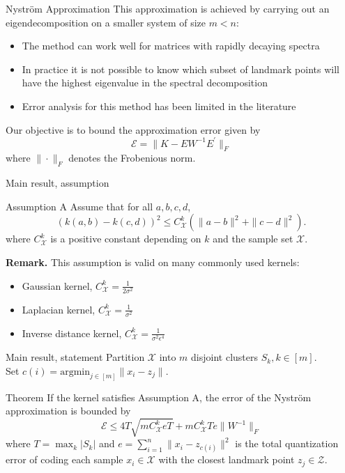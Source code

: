 \documentclass{beamer}
\renewcommand{\v}{\vspace{0.5em}}
\begin{document}
\begin{frame}{Nyström Approximation}
    This approximation is achieved by carrying out an eigendecomposition on a smaller system of size $m<n$:
    
    \begin{itemize}
        \item The method can work well for matrices with rapidly decaying spectra
        \item In practice it is not possible to know which subset of landmark points will have the highest eigenvalue in the spectral decomposition
        \item Error analysis for this method has been limited in the literature
    \end{itemize}
Our objective is to bound the approximation error given by
\begin{equation*}
    \mathcal{E}=\|K-EW^{-1}E^{\prime}\|_F
\end{equation*}
where $\|\cdot\|_F$ denotes the Frobenious norm.



\end{frame}


\begin{frame}{Main result, assumption}
\begin{block}{Assumption A}
Assume that for all $a,b,c,d$,
\begin{equation*}
    (k(a,b)-k(c,d))^2\leq C_{\mathcal{X}}^k (\|a-b\|^2+\|c-d\|^2).
\end{equation*}
where $C_{\mathcal{X}}^k$ is a positive constant depending on $k$ and the sample set $\mathcal{X}$.
\end{block}

\textbf{Remark.} This assumption is valid on many commonly used kernels:
\begin{itemize}
    \item Gaussian kernel, $C_{\mathcal{X}}^k=\frac{1}{2\sigma^2} $
    \item Laplacian kernel, $C_{\mathcal{X}}^k=\frac{1}{\sigma^2} $
    \item Inverse distance kernel, $C_{\mathcal{X}}^k=\frac{1}{\sigma^2 \epsilon^4} $
\end{itemize}
\end{frame}

\begin{frame}{Main result, statement}
Partition $\mathcal{X}$ into $m$ disjoint clusters $S_k, k\in [m]$. \\
\v
Set $c(i) = \textrm{argmin}_{j\in [m]} \|x_i-z_j\| $.
\begin{block}{Theorem}
If the kernel satisfies Assumption A, the error of the Nyström approximation is bounded by
\begin{equation*}
    \mathcal{E} \leq 4T\sqrt{mC_{\mathcal{X}}^k eT}+mC_{\mathcal{X}}^k Te \|W^{-1}\|_F
\end{equation*}
where $T=\max_k|S_k| $ and $e=\sum_{i=1 }^n \|x_i-z_{c(i)}\|^2$ is the total quantization error of coding each sample $x_i \in \mathcal{X}$ with the closest landmark point $z_j \in \mathcal{Z}$.
\end{block}


\end{frame}
\end{document}
